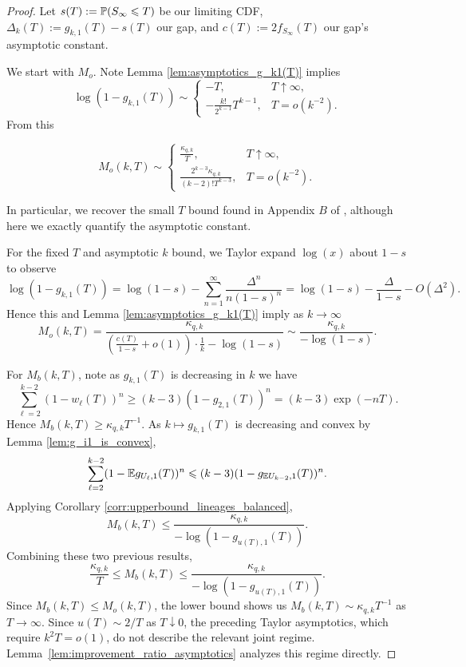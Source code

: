 \begin{proof}
Let $s(T) := \P(S_\infty \leq T)$ be our limiting CDF,
$\Delta_k(T) := g_{k,1}(T) - s(T)$ our gap, and
$c(T) := 2f_{S_\infty}(T)$ our gap's asymptotic constant.

We start with $M_o$. Note Lemma \ref{lem:asymptotics_g_k1(T)} implies
%
\begin{equation}
    \log(1-g_{k,1}(T)) \sim \begin{cases} - T, & T \uparrow \infty, \\
 -\frac{k!}{2^{k-1}} T^{k-1}, &  T = o(k^{-2}).
\end{cases}
\label{eqn:asymptotics_T_mapsto_log(one_minus_g_k1(T))}
\end{equation}
%
\noindent From this

\[M_{o}(k,T) \sim \begin{cases}
    \frac{\kappa_{q,k}}{T}, & T \uparrow \infty, \\
    \frac{2^{k-3}\kappa_{q,k}}{(k-2)! T^{k-3}}, & T = o(k^{-2}).
\end{cases}\]

\noindent In particular, we recover the small $T$ bound found in Appendix $B$ of \cite{shekhar2018_how_many_genes_are_enough}, although here we exactly quantify the asymptotic constant.

For the fixed $T$ and asymptotic $k$ bound, we Taylor expand $\log(x)$ about $1 - s$ to observe
%
\[\log(1 - g_{k,1}(T) )= \log(1-s)-\sum_{n=1}^\infty \frac{\Delta^n}{n(1-s)^n} = \log(1-s) - \frac{\Delta}{1-s} - O(\Delta^2).\]
%
\noindent Hence this and Lemma \ref{lem:asymptotics_g_k1(T)} imply as $k \to \infty$
%
\[M_o(k,T) = \frac{\kappa_{q,k}}{\left(\frac{c(T)}{1-s} + o(1)\right) \cdot \frac{1}{k} - \log(1-s)} \sim \frac{\kappa_{q,k}}{-\log(1-s)}.\]

\noindent For $M_b(k,T)$, note as $g_{k,1}(T)$ is decreasing in $k$ we have
%
\[\sum_{\ell=2}^{k-2} (1-w_\ell(T))^n \geq (k-3)(1-g_{2,1}(T))^n = (k-3)\exp(-nT).\]
%
\noindent Hence $M_b(k,T)\geq \kappa_{q,k}T^{-1}$.
As $k \mapsto g_{k,1}(T)$ is decreasing and convex by Lemma \ref{lem:g_i1_is_convex},
%
\[\sum_{\ell=2}^{k-2} (1-\E g_{U_\ell, 1}(T))^n \leq (k-3) (1- g_{\E U_{k-2}, 1}(T))^n.\]
%
\noindent Applying Corollary \ref{corr:upperbound_lineages_balanced},
%
\[M_b(k,T) \leq \frac{\kappa_{q,k}}{-\log(1-g_{u(T),1}(T))}.\]
%
\noindent Combining these two previous results,
%
\[\frac{\kappa_{q,k}}{T} \leq M_{b}(k,T) \leq \frac{\kappa_{q,k}}{-\log(1-g_{u(T), 1}(T))}.\]
%
\noindent Since $M_b(k,T) \leq M_o(k,T)$, the lower bound shows us $M_b(k,T) \sim \kappa_{q,k} T^{-1}$ as $T \to \infty$. Since $u(T) \sim 2/T$ as $T \downarrow 0$, the preceding Taylor asymptotics, which require $k^2T=o(1)$, do not describe the relevant joint regime. Lemma~\ref{lem:improvement_ratio_asymptotics} analyzes this regime directly.

\end{proof}

